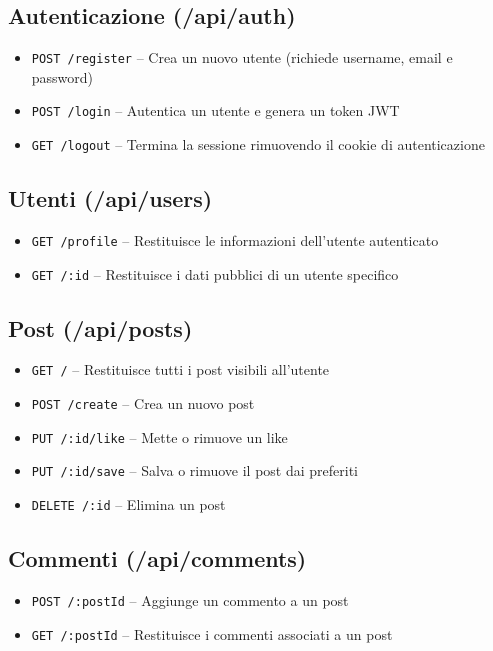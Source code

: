 \documentclass[a4paper,12pt]{article}
\begin{document}
\subsection{Autenticazione (/api/auth)}
\begin{itemize}
    \item \texttt{POST /register} – Crea un nuovo utente (richiede username, email e password)
    \item \texttt{POST /login} – Autentica un utente e genera un token JWT
    \item \texttt{GET /logout} – Termina la sessione rimuovendo il cookie di autenticazione
\end{itemize}

\subsection{Utenti (/api/users)}
\begin{itemize}
    \item \texttt{GET /profile} – Restituisce le informazioni dell’utente autenticato
    \item \texttt{GET /:id} – Restituisce i dati pubblici di un utente specifico
\end{itemize}

\subsection{Post (/api/posts)}
\begin{itemize}
    \item \texttt{GET /} – Restituisce tutti i post visibili all’utente
    \item \texttt{POST /create} – Crea un nuovo post
    \item \texttt{PUT /:id/like} – Mette o rimuove un like
    \item \texttt{PUT /:id/save} – Salva o rimuove il post dai preferiti
    \item \texttt{DELETE /:id} – Elimina un post
\end{itemize}

\subsection{Commenti (/api/comments)}
\begin{itemize}
    \item \texttt{POST /:postId} – Aggiunge un commento a un post
    \item \texttt{GET /:postId} – Restituisce i commenti associati a un post
\end{itemize}
\end{document}
